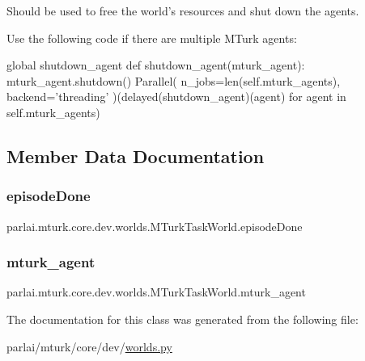 \begin{DoxyVerb}Should be used to free the world's resources and shut down the agents.

Use the following code if there are multiple MTurk agents:

global shutdown_agent
def shutdown_agent(mturk_agent):
    mturk_agent.shutdown()
Parallel(
    n_jobs=len(self.mturk_agents),
    backend='threading'
)(delayed(shutdown_agent)(agent) for agent in self.mturk_agents)
\end{DoxyVerb}
 

\subsection{Member Data Documentation}
\mbox{\label{classparlai_1_1mturk_1_1core_1_1dev_1_1worlds_1_1MTurkTaskWorld_a31c19dded93517b4a840dbba6dbb6612}} 
\subsubsection{\texorpdfstring{episode\+Done}{episodeDone}}
{\footnotesize\ttfamily parlai.\+mturk.\+core.\+dev.\+worlds.\+M\+Turk\+Task\+World.\+episode\+Done}

\mbox{\label{classparlai_1_1mturk_1_1core_1_1dev_1_1worlds_1_1MTurkTaskWorld_ac57f970ab26bb0526c73c03c1b8cad70}} 
\subsubsection{\texorpdfstring{mturk\+\_\+agent}{mturk\_agent}}
{\footnotesize\ttfamily parlai.\+mturk.\+core.\+dev.\+worlds.\+M\+Turk\+Task\+World.\+mturk\+\_\+agent}



The documentation for this class was generated from the following file\+:\begin{DoxyCompactItemize}
\item 
parlai/mturk/core/dev/\hyperlink{parlai_2mturk_2core_2dev_2worlds_8py}{worlds.\+py}\end{DoxyCompactItemize}
